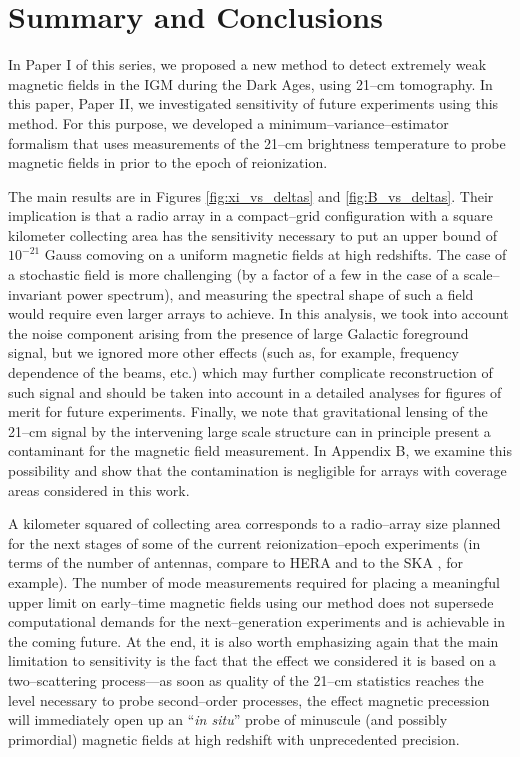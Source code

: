 \section{Summary and Conclusions}
\label{sec:conclusions}

In Paper I of this series, we proposed a new method to detect extremely weak magnetic fields in the IGM during the Dark Ages, using 21--cm tomography. In this paper, Paper II, we investigated sensitivity of future experiments using this method. For this purpose, we developed a minimum--variance--estimator formalism that uses measurements of the 21--cm brightness temperature to probe magnetic fields in prior to the epoch of reionization. 

The main results are in Figures \ref{fig:xi_vs_deltas} and \ref{fig:B_vs_deltas}. Their implication is that a radio array in a compact--grid configuration with a square kilometer collecting area has the sensitivity necessary to put an upper bound of $10^{-21}$ Gauss comoving on a uniform magnetic fields at high redshifts. The case of a stochastic field is more challenging (by a factor of a few in the case of a scale--invariant power spectrum), and measuring the spectral shape of such a field would require even larger arrays to achieve. In this analysis, we took into account the noise component arising from the presence of large Galactic foreground signal, but we ignored more other effects (such as, for example, frequency dependence of the beams, etc.) which may further complicate reconstruction of such signal and should be taken into account in a detailed analyses for figures of merit for future experiments. Finally, we note that gravitational lensing of the 21--cm signal by the intervening large scale structure can in principle present a contaminant for the magnetic field measurement. In Appendix B, we examine this possibility and show that the contamination is negligible for arrays with coverage areas considered in this work.

A kilometer squared of collecting area corresponds to a radio--array size planned for the next stages of some of the current reionization--epoch experiments (in terms of the number of antennas, compare to HERA and to the SKA \cite{2008arXiv0802.1727C}, for example). The number of mode measurements required for placing a meaningful upper limit on early--time magnetic fields using our method does not supersede computational demands for the next--generation  experiments and is achievable in the coming future. At the end, it is also worth emphasizing again that the main limitation to sensitivity is the fact that the effect we considered it is based on a two--scattering process---as soon as quality of the 21--cm statistics reaches the level necessary to probe second--order processes, the effect magnetic precession will immediately open up an ``\textit{in situ}'' probe of minuscule (and possibly primordial) magnetic fields at high redshift with unprecedented precision. 

  